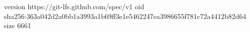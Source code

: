 version https://git-lfs.github.com/spec/v1
oid sha256:363a042d2a0bb1a3993a1b69ff3e1e5462247ea3986655f781c72a4412b82d64
size 6661
